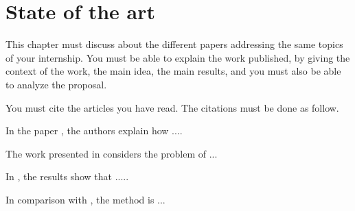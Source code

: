\chapter{State of the art}



This chapter must discuss about the different papers addressing the same topics of your internship.
You must be able to explain the work published, by giving the context of the work, the main idea, the main results, and you must also be able to analyze the proposal.

\vspace*{2cm}



You must cite the articles you have read. The citations must be done as follow. \\



\vspace*{2cm}

In the paper \cite{Abr98}, the authors explain how ....

\vspace*{1cm}


The work presented in  \cite{Hau03b} considers the problem of ...


\vspace*{1cm}

In \cite{Ham95}, the results show that .....


\vspace*{1cm}

In comparison with \cite{Hau03a}, the method is ...


